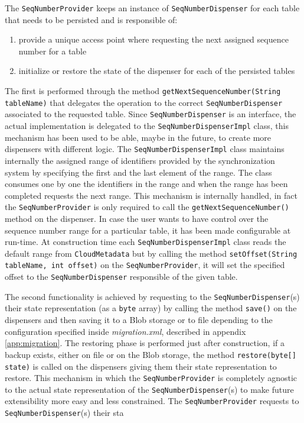 \noindent The \texttt{SeqNumberProvider} keeps an instance of \texttt{SeqNumberDispenser} for each table that needs to be persisted and is responsible of:
\begin{enumerate}
\item provide a unique access point where requesting the next assigned sequence number for a table
\item initialize or restore the state of the dispenser for each of the persisted tables
\end{enumerate}
\noindent The first is performed through the method \texttt{getNextSequenceNumber(String tableName)} that delegates the operation to the correct \texttt{SeqNumberDispenser} associated to the requested table.
Since \texttt{SeqNumberDispenser} is an interface, the actual implementation is delegated to the \texttt{SeqNumberDispenserImpl} class, this mechanism has been used to be able, maybe in the future, to create more dispensers with different logic.
\noindent The \texttt{SeqNumberDispenserImpl} class maintains internally the assigned range of identifiers provided by the synchronization system by specifying the first and the last element of the range. The class consumes one by one the identifiers in the range and when the range has been completed requests the next range. This mechanism is internally handled, in fact the \texttt{SeqNumberProvider} is only required to call the \texttt{getNextSequenceNumber()} method on the dispenser.
In case the user wants to have control over the sequence number range for a particular table, it has been made configurable at run-time. At construction time each \texttt{SeqNumberDispenserImpl}  class reads the default range from \texttt{CloudMetadata} but by calling the method \texttt{setOffset(String tableName, int offset)} on the \texttt{SeqNumberProvider}, it will set the specified offset to the \texttt{SeqNumberDispenser} responsible of the given table.

\newparagraph The second functionality is achieved by requesting to the \texttt{SeqNumberDispenser}(s) their state representation (as a \texttt{byte} array) by calling the method \texttt{save()} on the dispensers and then saving it to a Blob storage or to file depending to the configuration specified inside \textit{migration.xml}, described in appendix \ref{app:migration}. 
\noindent The restoring phase is performed just after construction, if a backup exists, either on file or on the Blob storage, the method \texttt{restore(byte[] state)} is called on the dispensers giving them their state representation to restore.
This mechanism in which the \texttt{SeqNumberProvider} is completely agnostic to the actual state representation of the \texttt{SeqNumberDispenser}(s) to make future extensibility more easy and less constrained.
The \texttt{SeqNumberProvider} requests to \texttt{SeqNumberDispenser}(s) their sta


